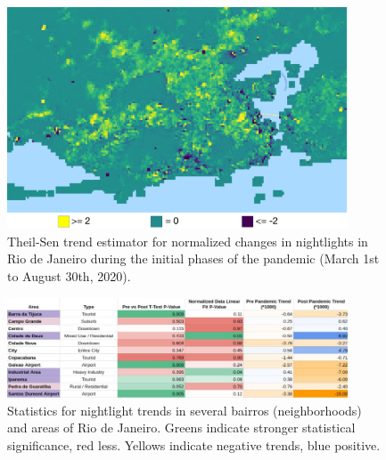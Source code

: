 \begin{figure}[h]
\centering
\includegraphics[width=0.9\textwidth]{Figures/chap5/Nightlights_TS.png}
\caption[Changes in nightlights in Rio de Janeiro]{Theil-Sen trend estimator for normalized changes in nightlights in Rio de Janeiro during the initial phases of the pandemic (March 1st to August 30th, 2020).}
\label{fig:nlts}
\end{figure}

\begin{figure}[H] 
\centering
\includegraphics[width=0.9\textwidth]{Figures/chap5/RioNightStats.jpg}
\caption[Nightlight Statistics for Rio de Janeiro]{Statistics for nightlight trends in several bairros (neighborhoods) and areas of Rio de Janeiro. Greens indicate stronger statistical significance, red less. Yellows indicate negative trends, blue positive.}
\label{fig:nstats}
\end{figure}


\newpage

